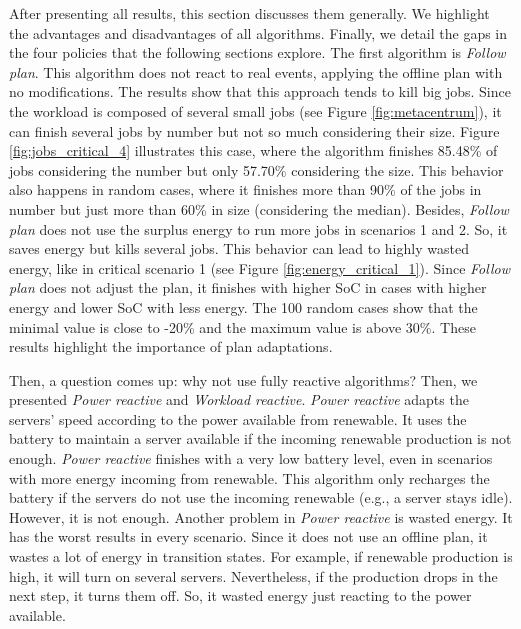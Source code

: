 After presenting all results, this section discusses them generally. We highlight the advantages and disadvantages of all algorithms. Finally, we detail the gaps in the four policies that the following sections explore. The first algorithm is \emph{Follow plan}. This algorithm does not react to real events, applying the offline plan with no modifications. The results show that this approach tends to kill big jobs. Since the workload is composed of several small jobs (see Figure \ref{fig:metacentrum}), it can finish several jobs by number but not so much considering their size. Figure \ref{fig:jobs_critical_4} illustrates this case, where the algorithm finishes 85.48\% of jobs considering the number but only 57.70\% considering the size. This behavior also happens in random cases, where it finishes more than 90\% of the jobs in number but just more than 60\% in size (considering the median). Besides, \emph{Follow plan} does not use the surplus energy to run more jobs in scenarios 1 and 2. So, it saves energy but kills several jobs. This behavior can lead to highly wasted energy, like in critical scenario 1 (see Figure \ref{fig:energy_critical_1}). Since \emph{Follow plan} does not adjust the plan, it finishes with higher SoC in cases with higher energy and lower SoC with less energy. The 100 random cases show that the minimal value is close to -20\% and the maximum value is above 30\%. These results highlight the importance of plan adaptations.

Then, a question comes up: why not use fully reactive algorithms? Then, we presented \emph{Power reactive} and \emph{Workload reactive}. \emph{Power reactive} adapts the servers' speed according to the power available from renewable. It uses the battery to maintain a server available if the incoming renewable production is not enough. \emph{Power reactive} finishes with a very low battery level, even in scenarios with more energy incoming from renewable. This algorithm only recharges the battery if the servers do not use the incoming renewable (e.g., a server stays idle). However, it is not enough. Another problem in \emph{Power reactive} is wasted energy. It has the worst results in every scenario. Since it does not use an offline plan, it wastes a lot of energy in transition states. For example, if renewable production is high, it will turn on several servers. Nevertheless, if the production drops in the next step, it turns them off. So, it wasted energy just reacting to the power available.


